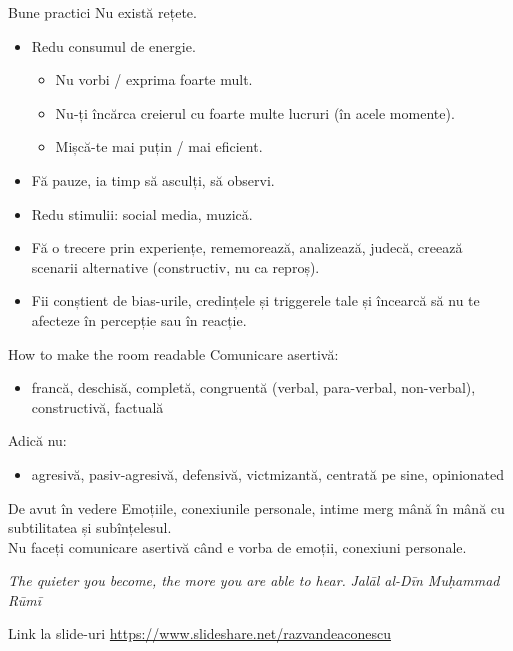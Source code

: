 \documentclass{simple}
\begin{document}
\begin{frame}{Bune practici}
  \pause Nu există rețete.
  \begin{itemize}
    \pause \item Redu consumul de energie.
      \begin{itemize}
        \pause \item Nu vorbi / exprima foarte mult.
        \pause \item Nu-ți încărca creierul cu foarte multe lucruri (în acele momente).
        \pause \item Mișcă-te mai puțin / mai eficient.
      \end{itemize}
    \pause \item Fă pauze, ia timp să asculți, să observi.
    \pause \item Redu stimulii: social media, muzică.
    \pause \item Fă o trecere prin experiențe, rememorează, analizează, judecă, creează scenarii alternative (constructiv, nu ca reproș).
    \pause \item Fii conștient de bias-urile, credințele și triggerele tale și încearcă să nu te afecteze în percepție sau în reacție.
  \end{itemize}
\end{frame}

\begin{frame}{How to make the room readable}
  \pause Comunicare asertivă:
  \begin{itemize}
    \pause \item francă, deschisă, completă, congruentă (verbal, para-verbal, non-verbal), constructivă, factuală
  \end{itemize}
  \pause Adică nu:
  \begin{itemize}
    \pause \item agresivă, pasiv-agresivă, defensivă, victmizantă, centrată pe sine, opinionated
  \end{itemize}
\end{frame}

\begin{frame}{De avut în vedere}
  \centering
  \pause
  \Large
  Emoțiile, conexiunile personale, intime merg mână în mână cu subtilitatea și subînțelesul. \\
  \pause
  \vspace{1cm}
  Nu faceți comunicare asertivă când e vorba de emoții, conexiuni personale.
\end{frame}

\begin{frame}{}
  \centering
  \pause
  \Large
  \textit{The quieter you become, the more you are able to hear.}
  \vspace{3mm}
  \hfill \textit{Jalāl al-Dīn Muḥammad Rūmī}
\end{frame}

\begin{frame}{Link la slide-uri}
  \url{https://www.slideshare.net/razvandeaconescu}
\end{frame}
\end{document}
